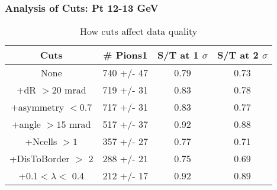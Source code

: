 \frame
{
\frametitle{Analysis of Cuts: Pt 12-13 GeV}
\begin{table}
\caption{How cuts affect data quality}
\centering
\begin{tabular}{c c c c}
\hline\hline
Cuts & \# Pions1 & S/T at 1 $\sigma$ & S/T at 2 $\sigma$ \\ [0.5ex]
\hline
None &  740 +/-   47 & 0.79 & 0.73 \\ %
+dR $> 20$ mrad &  719 +/-   31 & 0.83 & 0.78 \\ %
+asymmetry $< 0.7$ &  717 +/-   31 & 0.83 & 0.77 \\ %
+angle $> 15$ mrad &  517 +/-   37 & 0.92 & 0.88 \\ %
+Ncells $> 1$&  357 +/-   27 & 0.77 & 0.71 \\ %
+DisToBorder $>$ 2 &  288 +/-   21 & 0.75 & 0.69 \\ %
+$0.1 < \lambda <$ 0.4 &  212 +/-   17 & 0.92 & 0.89 \\ %
[1ex]
\hline
\end{tabular}
\label{table:nonlin}
\end{table}
}
